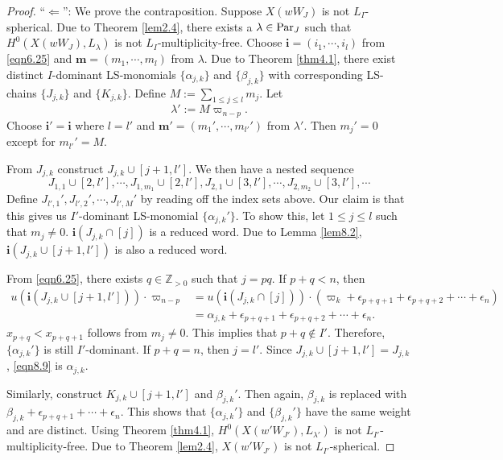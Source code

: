 \documentclass[12pt]{amsart}
\theoremstyle{definition}
\theoremstyle{remark}
\newcommand{\Z}{\mathbb{Z}}
\newcommand{\Parj}{{\rm Par}_J}
\begin{document}
\begin{proof}
``$\Leftarrow$'': We prove the contraposition. Suppose $X(wW_J)$ is not $L_I$-spherical. Due to Theorem \ref{lem2.4}, there exists a $\lambda \in \Parj$ such that $H^0(X(wW_J),L_\lambda)$ is not $L_{I}$-multiplicity-free. Choose $\mathbf{i} = (i_1 , \cdots , i_l)$ from \eqref{eqn6.25} and $\mathbf{m} = (m_1 , \cdots, m_l)$ from $\lambda$. Due to Theorem \ref{thm4.1}, there exist distinct $I$-dominant LS-monomials $\{\alpha_{j,k}\}$ and $\{\beta_{j,k}\}$ with corresponding LS-chains $\{J_{j,k}\}$ and $\{K_{j,k}\}$. Define $M:= \sum_{1 \leq j \leq l} {m_j}$. Let
\begin{equation}
\lambda' := M \varpi_{n-p}.
\end{equation}
Choose $\mathbf{i'} = \mathbf{i}$ where $l = l'$ and $\mathbf{m'} = (m_1 ' , \cdots , m_{l'}')$ from $\lambda'$. Then $m_{j}' = 0$ except for $m_{l'}' = M$.

From $J_{j,k}$ construct $J_{j,k} \cup [j+1 , l']$. We then have a nested sequence
\begin{equation}
J_{1,1} \cup [2,l'] , \cdots , J_{1,m_1} \cup [2, l'] , J_{2,1} \cup [3,l'] , \cdots, J_{2, m_2} \cup [3,l'] , \cdots 
\end{equation}
Define $J_{l',1}' , J_{l',2}' , \cdots , J_{l',M}'$ by reading off the index sets above. Our claim is that this gives us $I'$-dominant LS-monomial $\{\alpha_{j,k}'\}$. To show this, let $1 \leq j \leq l$ such that $m_j \neq 0$. $\mathbf{i} (J_{j,k} \cap [j])$ is a reduced word. Due to Lemma \ref{lem8.2}, $\mathbf{i} (J_{j,k} \cup [j+1, l '])$ is also a reduced word. 

From \eqref{eqn6.25}, there exists $q \in \Z_{>0}$ such that $j = pq$. If $p+q <n$, then
\begin{align}\label{eqn8.9}
u(\mathbf{i} (J_{j,k} \cup [j+1, l '])) \cdot \varpi_{n-p} &= u(\mathbf{i} (J_{j,k} \cap [j])) \cdot (\varpi_k + \epsilon_{p+q+1} + \epsilon_{p+q+2} + \cdots + \epsilon_n) \\
&= \alpha_{j,k} + \epsilon_{p+q+1} + \epsilon_{p+q+2} + \cdots + \epsilon_n.
\end{align}
$x_{p+q} < x_{p+q+1}$ follows from $m_j \neq 0$. This implies that $p+q \notin I'$. Therefore, $\{ \alpha_{j , k}' \}$ is still $I'$-dominant. If $p+q = n$, then $j = l'$. Since $J_{j,k} \cup [j+1, l '] = J_{j,k}$, \eqref{eqn8.9} is $\alpha_{j,k}$.

Similarly, construct $K_{j,k} \cup [j+1 , l']$ and $\beta_{j,k}'$. Then again, $\beta_{j,k}$ is replaced with $\beta_{j,k} + \epsilon_{p+q+1} + \cdots + \epsilon_n$. This shows that $\{ \alpha_{j,k}' \}$ and $\{ \beta_{j,k}' \}$ have the same weight and are distinct. Using Theorem \ref{thm4.1}, $H^0(X(w'W_{J'}), L_{\lambda'})$ is not $L_{I'}$-multiplicity-free. Due to Theorem \ref{lem2.4}, $X(w'W_{J'})$ is not $L_{I'}$-spherical.
\end{proof}
\end{document}
